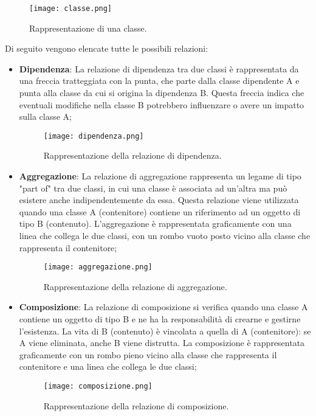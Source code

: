     \begin{figure}[H]
        \centering
        \texttt{[image: classe.png]}
        \caption{Rappresentazione di una classe.}
    \end{figure}
    \vspace{2mm}
     Di seguito vengono elencate tutte le possibili relazioni:
     \begin{itemize}
        \item \textbf{Dipendenza}: La relazione di dipendenza tra due classi è rappresentata da una freccia tratteggiata con la punta, che parte dalla classe dipendente A e punta alla classe da cui si origina la dipendenza B. Questa freccia indica che eventuali modifiche nella classe B potrebbero influenzare o avere un impatto sulla classe A;
        \begin{figure}[H]
            \centering
            \texttt{[image: dipendenza.png]}
            \caption{Rappresentazione della relazione di dipendenza.}
        \end{figure}
        
        \item \textbf{Aggregazione}: La relazione di aggregazione rappresenta un legame di tipo "part of" tra due classi, in cui una classe è associata ad un'altra ma può esistere anche indipendentemente da essa. Questa relazione viene utilizzata quando una classe A (contenitore) contiene un riferimento ad un oggetto di tipo B (contenuto). L'aggregazione è rappresentata graficamente con una linea che collega le due classi, con un rombo vuoto posto vicino alla classe che rappresenta il contenitore;
        \begin{figure}[H]
            \centering
            \texttt{[image: aggregazione.png]}
            \caption{Rappresentazione della relazione di aggregazione.}
        \end{figure}
        
        \item \textbf{Composizione}: La relazione di composizione si verifica quando una classe A contiene un oggetto di tipo B e ne ha la responsabilità di crearne e gestirne l'esistenza. La vita di B (contenuto) è vincolata a quella di A (contenitore): se A viene eliminata, anche B viene distrutta. La composizione è rappresentata graficamente con un rombo pieno vicino alla classe che rappresenta il contenitore e una linea che collega le due classi;
        \begin{figure}[H]
            \centering
            \texttt{[image: composizione.png]}
            \caption{Rappresentazione della relazione di composizione.}
        \end{figure}
        

\end{itemize}
